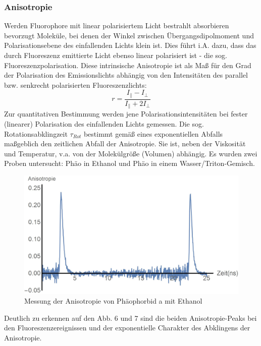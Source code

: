 \documentclass{article}
\begin{document}
\subsubsection{Anisotropie}
Werden Fluorophore mit linear polarisiertem Licht bestrahlt absorbieren bevorzugt Moleküle, bei denen der Winkel zwischen Übergangsdipolmoment und Polarisationsebene des einfallenden Lichts klein ist. Dies führt i.A. dazu, dass das durch Fluoreszenz emittierte Licht ebenso linear polarisiert ist - die sog. Fluoreszenzpolarisation. Diese intrinsische Anisotropie ist als Maß für den Grad der Polarisation des Emissionslichts abhängig von den Intensitäten des parallel bzw. senkrecht polarisierten Fluoreszenzlichts: $$ r = \frac{I_\parallel-I_\perp}{I_\parallel+2 I_\perp} $$ Zur quantitativen Bestimmung werden jene Polarisationsintensitäten bei fester (linearer) Polarisation des einfallenden Lichts gemessen. Die sog. Rotationsabklingzeit $\tau_{Rot}$ bestimmt gemäß eines exponentiellen Abfalls maßgeblich den zeitlichen Abfall der Anisotropie. Sie ist, neben der Viskosität und Temperatur, v.a. von der Molekülgröße (Volumen) abhängig. Es wurden zwei Proben untersucht: Phäo in Ethanol und Phäo in einem Wasser/Triton-Gemisch.

\begin{figure}[H]
  \centering
  \includegraphics[width=\textwidth]{Bilder/anisotropie_ethanol.jpg}
  \caption{Messung der Anisotropie von Phäophorbid a mit Ethanol}
\end{figure}

Deutlich zu erkennen auf den Abb. 6 und 7 sind die beiden Anisotropie-Peaks bei den Fluoreszenzereignissen und der exponentielle Charakter des Abklingens der Anisotropie.
\end{document}
